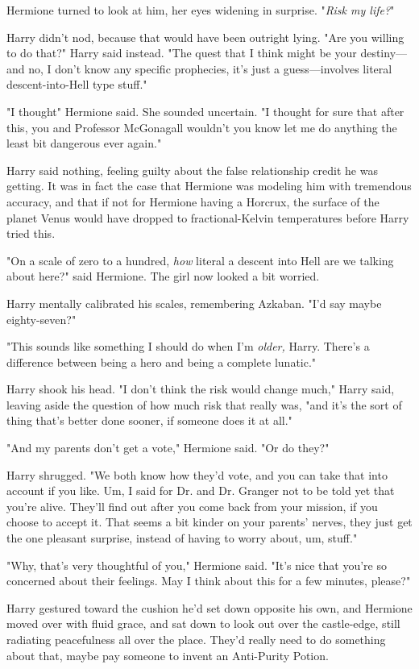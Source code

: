 Hermione turned to look at him, her eyes widening in surprise. "\emph{Risk my
life?}"

Harry didn't nod, because that would have been outright lying. "Are you willing
to do that?" Harry said instead. "The quest that I think might be your
destiny—and no, I don't know any specific prophecies, it's just a
guess—involves literal descent-into-Hell type stuff."

"I thought{\el}" Hermione said. She sounded uncertain. "I thought for sure
that after this, you and Professor McGonagall wouldn't{\el} you know{\el}
let me do anything the least bit dangerous ever again."

Harry said nothing, feeling guilty about the false relationship credit he was
getting. It was in fact the case that Hermione was modeling him with tremendous
accuracy, and that if not for Hermione having a Horcrux, the surface of the
planet Venus would have dropped to fractional-Kelvin temperatures before Harry
tried this.

"On a scale of zero to a hundred, \emph{how} literal a descent into Hell are we
talking about here?" said Hermione. The girl now looked a bit worried.

Harry mentally calibrated his scales, remembering Azkaban. "I'd say maybe
eighty-seven?"

"This sounds like something I should do when I'm \emph{older,} Harry. There's a
difference between being a hero and being a complete lunatic."

Harry shook his head. "I don't think the risk would change much," Harry said,
leaving aside the question of how much risk that really was, "and it's the sort
of thing that's better done sooner, if someone does it at all."

"And my parents don't get a vote," Hermione said. "Or do they?"

Harry shrugged. "We both know how they'd vote, and you can take that into
account if you like. Um, I said for Dr. and Dr. Granger not to be told yet that
you're alive. They'll find out after you come back from your mission, if you
choose to accept it. That seems a bit{\el} kinder on your parents' nerves,
they just get the one pleasant surprise, instead of having to worry about, um,
stuff."

"Why, that's very thoughtful of you," Hermione said. "It's nice that you're so
concerned about their feelings. May I think about this for a few minutes,
please?"

Harry gestured toward the cushion he'd set down opposite his own, and Hermione
moved over with fluid grace, and sat down to look out over the castle-edge,
still radiating peacefulness all over the place. They'd really need to do
something about that, maybe pay someone to invent an Anti-Purity Potion.

